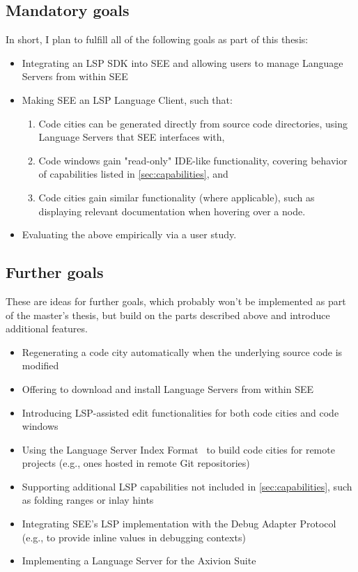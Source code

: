 \documentclass{scrartcl}
\newcommand{\SEE}{\textsc{SEE}}
\begin{document}
{\subsection{Mandatory goals}
In short, I plan to fulfill all of the following goals as part of this thesis:
\begin{itemize}
	\item Integrating an LSP SDK into \SEE{} and allowing users to manage Language Servers from within SEE
	\item Making \SEE{} an LSP Language Client, such that:
	      \begin{enumerate}
		      \item Code cities can be generated directly from source code directories, using Language Servers that \SEE{} interfaces with,
		      \item Code windows gain "read-only" IDE-like functionality, covering behavior of capabilities listed in \cref{sec:capabilities}, and
		      \item Code cities gain similar functionality (where applicable), such as displaying relevant documentation when hovering over a node.
	      \end{enumerate}
	\item Evaluating the above empirically via a user study.
\end{itemize}

\subsection{Further goals}
These are ideas for further goals, which probably won't be implemented as part of the master's thesis, but build on the parts described above and introduce additional features.
\begin{itemize}
	\item Regenerating a code city automatically when the underlying source code is modified
	\item Offering to download and install Language Servers from within \SEE{}
	\item Introducing LSP-assisted edit functionalities for both code cities and code windows
	\item Using the Language Server Index Format~\cite{lsif} to build code cities for remote projects (e.g., ones hosted in remote Git repositories)
	\item Supporting additional LSP capabilities not included in \cref{sec:capabilities}, such as folding ranges or inlay hints
	\item Integrating \SEE{}'s LSP implementation with the Debug Adapter Protocol~\cite{dap} (e.g., to provide inline values in debugging contexts)
	\item Implementing a Language Server for the Axivion Suite
\end{itemize}

}
\end{document}
